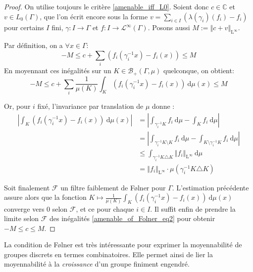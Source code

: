 \documentclass[a4paper,12pt]{article}
\newcommand{\C}{\mathbb{C}}
\newcommand{\Bor}{\mathcal{B}}
\newcommand{\norm}[1]{\left\Vert #1\right\Vert}
\newcommand{\abs}[1]{\left\vert#1\right\vert}
\newcommand{\integral}[4]{\int_{#1}^{#2} #3~\mathrm{d}#4}
\newcommand{\inv}{^{-1}}
\newcommand{\TODO}[1]{}%
\begin{document}
\begin{proof}
    On utilise toujours le critère \ref{amenable_iff_L0}. Soient donc $c\in\C$ et $v\in L_0(\Gamma)$, 
    que l'on écrit encore sous la forme $v = \sum_{i\in I} (\lambda(\gamma_i)(f_i) - f_i)$ pour certains $I$ fini, $\gamma : I \to\Gamma$ et
    $f : I\to \mathscr{L}^\infty(\Gamma)$. Posons aussi $M := \norm{c + v}_{\mathrm{L}^\infty}$.

    Par définition, on a $\forall x\in\Gamma$:
    \begin{equation}\label{amenable_of_Folner_eq1}
        -M \le c + \sum_i (f_i(\gamma_i\inv x) - f_i(x)) \le M
    \end{equation}
    En moyennant ces inégalités sur un $K\in\Bor_+(\Gamma, \mu)$ quelconque, on obtient:
    \begin{equation}\label{amenable_of_Folner_eq2}
        -M \le c + \sum_i \frac1{\mu(K)} \integral{K}{}{\left(f_i(\gamma_i\inv x) - f_i(x)\right)}{\mu(x)} \le M
    \end{equation}

    Or, pour $i$ fixé, l'invariance par translation de $\mu$ donne :
    \begin{align*}
        \abs{\integral{K}{}{(f_i(\gamma_i\inv x) - f_i(x))}{\mu(x)}} 
            &= \abs{\integral{\gamma_i\inv K}{}{f_i}{\mu} - \integral{K}{}{f_i}{\mu}} \\
            &= \abs{\integral{\gamma_i\inv K\setminus K}{}{f_i}{\mu} - \integral{K\setminus\gamma_i\inv K}{}{f_i}{\mu}} \\
            &\le \integral{\gamma_i\inv K\triangle K}{}{\norm{f_i}_{\mathrm{L}^\infty}}{\mu} \\
            &= \norm{f_i}_{\mathrm{L}^\infty} \cdot \mu(\gamma_i\inv K\triangle K)
    \end{align*}
    
    Soit finalement $\mathscr{F}$ un filtre faiblement de F\o{}lner pour $\Gamma$. L'estimation précédente assure alors que
    la fonction $K\mapsto\frac1{\mu(K)} \integral{K}{}{(f_i(\gamma_i\inv x) - f_i(x))}{\mu(x)}$ converge vers $0$
    selon $\mathscr{F}$, et ce pour chaque $i\in I$. Il suffit enfin de prendre la limite selon $\mathscr{F}$ des inégalités \ref{amenable_of_Folner_eq2}
    pour obtenir $-M\le c\le M$. 
\end{proof}

La condition de F\o{}lner est très intéressante pour exprimer la moyennabilité de groupes discrets en termes combinatoires. Elle permet ainsi 
de lier la moyennabilité à la \emph{croissance} d'un groupe finiment engendré. %
\end{document}
